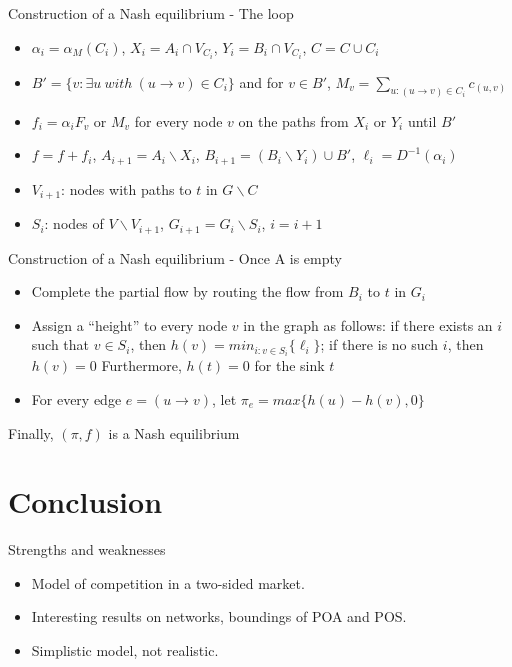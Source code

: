 \documentclass{beamer}
\begin{document}
\begin{frame}{Construction of a Nash equilibrium - The loop}

\begin{itemize}

\item $\alpha_i = \alpha_M(C_i)$, $X_i = A_i \cap V_{C_i}$, $Y_i = B_i \cap V_{C_i}$, $C = C \cup C_i$
\item $B' = \{ v : \exists u\ with\ (u \to v) \in C_i\}$ and for $v \in B'$, $M_v = \sum_{u :(u \to v) \in C_i}c_{(u,v)}$
\item $f_i = \alpha_i F_v$ or $M_v$ for every node $v$ on the paths from $X_i$ or $Y_i$ until $B'$
\item $f = f+f_i$, $A_{i+1} = A_i \backslash X_i$, $B_{i+1} = (B_i \backslash Y_i) \cup B'$, $\ell_i = D^{-1}(\alpha_i)$
\item $V_{i+1}$: nodes with paths to $t$ in $G \backslash C$
\item $S_i$: nodes of $V \backslash V_{i+1}$, $G_{i+1} = G_i \backslash S_i$, $i=i+1$

\end{itemize}

\end{frame}

\begin{frame}{Construction of a Nash equilibrium - Once A is empty}

\begin{itemize}

\item Complete the partial flow by routing the flow from $B_i$ to $t$ in $G_i$
\item Assign a “height” to every node $v$ in the graph as follows: if there exists an $i$ such 
that $v \in S_i$, then $h(v) = min_{i:v\in S_i}\{\ell_i\}$; if there is no such $i$,
 then $h(v) = 0$ Furthermore, $h(t)= 0$ for the sink $t$
\item For every edge $e = (u \to v)$, let $\pi_e = max\{h(u) - h(v), 0\}$

\end{itemize}

Finally, $(\pi, f)$ is a Nash equilibrium 

\end{frame}

\section{Conclusion}

\begin{frame}{Strengths and weaknesses}


\begin{itemize}

\item Model of competition in a two-sided market.

\item Interesting results on networks, boundings of POA and POS.

\item Simplistic  model, not realistic.

\end{itemize}



\end{frame}
\end{document}
